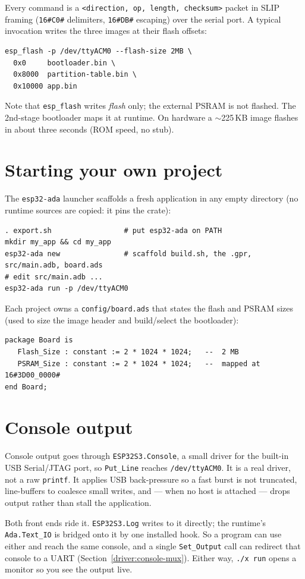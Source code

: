 Every command is a \texttt{<direction, op, length, checksum>} packet in SLIP
framing (\texttt{16\#C0\#} delimiters, \texttt{16\#DB\#} escaping) over the serial port.
A typical invocation writes the three images at their flash offsets:

\begin{lstlisting}[style=sh]
esp_flash -p /dev/ttyACM0 --flash-size 2MB \
  0x0     bootloader.bin \
  0x8000  partition-table.bin \
  0x10000 app.bin
\end{lstlisting}

Note that \texttt{esp\_flash} writes \emph{flash} only; the external PSRAM is not
flashed. The 2nd-stage bootloader maps it at runtime. On hardware a $\sim$225\,KB
image flashes in about three seconds (ROM speed, no stub).

\section{Starting your own project}\index{esp32-ada launcher}\index{board.ads}

The \texttt{esp32-ada} launcher scaffolds a fresh application in any empty
directory (no runtime sources are copied: it pins the crate):

\begin{lstlisting}[style=sh]
. export.sh                 # put esp32-ada on PATH
mkdir my_app && cd my_app
esp32-ada new               # scaffold build.sh, the .gpr, src/main.adb, board.ads
# edit src/main.adb ...
esp32-ada run -p /dev/ttyACM0
\end{lstlisting}

Each project owns a \texttt{config/board.ads} that states the flash and PSRAM
sizes (used to size the image header and build/select the bootloader):

\begin{lstlisting}
package Board is
   Flash_Size : constant := 2 * 1024 * 1024;   --  2 MB
   PSRAM_Size : constant := 2 * 1024 * 1024;   --  mapped at 16#3D00_0000#
end Board;
\end{lstlisting}

\section{Console output}

Console output goes through \texttt{ESP32S3.Console}, a small driver for the
built-in USB Serial/JTAG port, so \texttt{Put\_Line} reaches \texttt{/dev/ttyACM0}.
It is a real driver, not a raw \texttt{printf}. It applies USB back-pressure so a
fast burst is not truncated, line-buffers to coalesce small writes, and --- when
no host is attached --- drops output rather than stall the application.

Both front ends ride it. \texttt{ESP32S3.Log} writes to it directly; the runtime's
\texttt{Ada.Text\_IO} is bridged onto it by one installed hook. So a program can
use either and reach the same console, and a single \texttt{Set\_Output} call can
redirect that console to a UART (Section~\ref{driver:console-mux}). Either way,
\texttt{./x run} opens a monitor so you see the output live.
